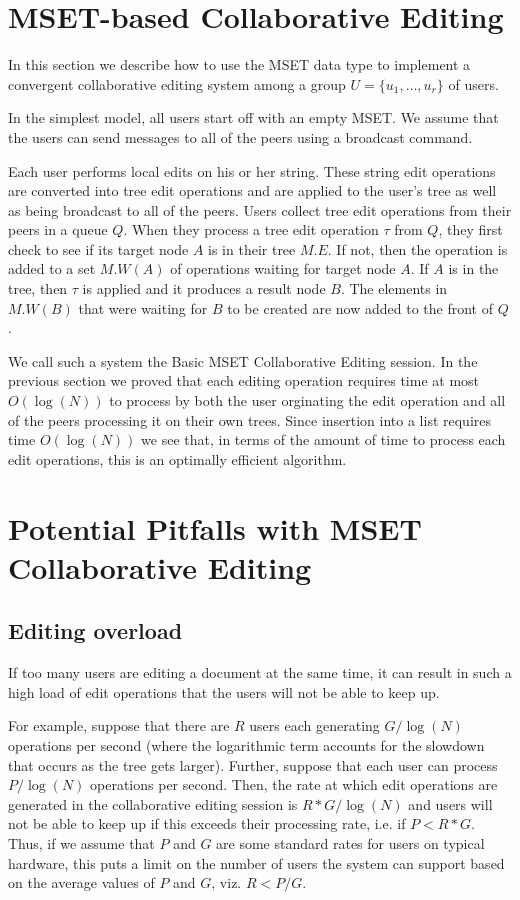 \documentclass{amsart}
\begin{document}
\section{MSET-based Collaborative Editing}
\label{sec:collabed}
In this section we describe how to use the MSET data type to implement a convergent collaborative editing system among a group $U = \{u_1,\ldots,u_r\}$ of users.

In the simplest model, all users start off with an empty MSET. We assume that the users can send messages to all of the peers using a broadcast command. 

Each user performs local edits on his or her string. These string edit operations are converted into tree edit operations and are applied to the user's tree as well as being broadcast to all of the peers.  Users collect tree edit operations from their peers in a queue $Q$. When they process a tree edit operation $\tau$ from $Q$, they first check to see if its target node $A$ is in their tree $M.E$.  If not, then the operation is added to a set $M.W(A)$ of operations waiting for target node $A$.  If $A$ is in the tree, then $\tau$ is applied and it produces a result node $B$. The elements in $M.W(B)$ that were waiting for $B$ to be created are now added to the front of $Q$.

We call such a system the Basic MSET Collaborative Editing session. In the previous section we proved that each editing operation requires time at most $O(\log(N))$ to process by both the user orginating the edit operation and all of the peers processing it on their own trees.  Since insertion into a list requires time $O(\log(N))$ we see that, in terms of the amount of time to process each edit operations, this is an optimally efficient algorithm.

\section{Potential Pitfalls with MSET Collaborative Editing}
\label{sec:pitfalls}

\subsection{Editing overload}
If too many users are editing a document at the same time, it can result in such a high load of edit operations that the users will not be able to keep up.

For example, suppose that there are $R$ users each generating $G/\log(N)$ operations per second (where the logarithmic term accounts for the slowdown that occurs as the tree gets larger). Further, suppose that each user can process $P/\log(N)$ operations per second. Then, the rate at which edit operations are generated in the collaborative editing session is $R*G/\log(N)$ and users will
not be able to keep up if this exceeds their processing rate, i.e. if $P<R*G$.
Thus, if we assume that $P$ and $G$ are some standard rates for users on
typical hardware, this puts a limit on the number of users the system can support based on the average values of $P$ and $G$, viz. $R < P/G$.
\end{document}
